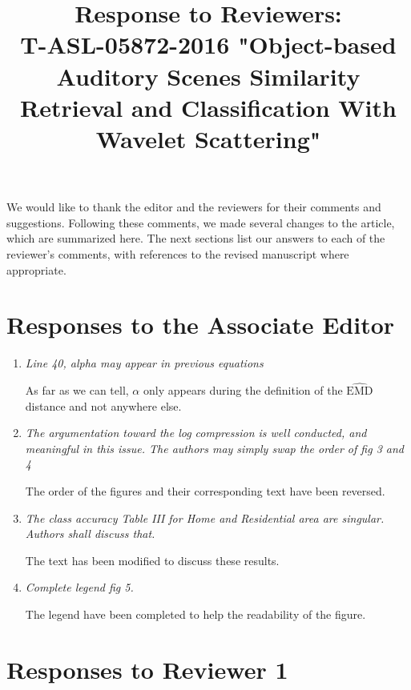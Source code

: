 \documentclass[10pt]{article}
\title{Response to Reviewers: \\ T-ASL-05872-2016 "Object-based Auditory Scenes Similarity Retrieval and Classification With Wavelet Scattering"}
\begin{document}
\maketitle

We would like to thank the editor and the reviewers for their comments and suggestions. Following these comments, we made several changes to the article, which are summarized here. The next sections list our answers to each of the reviewer's comments, with references to the revised manuscript where appropriate.

\section{Responses to the Associate Editor}

\begin{enumerate}

\item \emph{Line 40, alpha may appear in previous equations}

As far as we can tell, $\alpha$ only appears during the definition of the $\widehat{\mathrm{EMD}}$ distance and not anywhere else.

\item \emph{The argumentation toward the log compression is well conducted, and meaningful in this issue. The authors may simply swap the order of fig 3 and 4}

The order of the figures and their corresponding text have been reversed.

\item \emph{The class accuracy Table III for Home and Residential area are singular. Authors shall discuss that.}

The text has been modified to discuss these results.

\item \emph{Complete legend fig 5.}

The legend have been completed to help the readability of the figure.

\end{enumerate}

\section{Responses to Reviewer 1}
\end{document}

